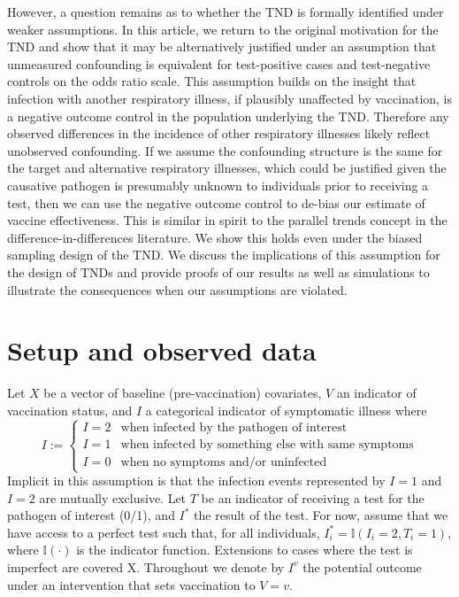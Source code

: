 \documentclass[11pt]{article}
\begin{document}
However, a question remains as to whether the TND is formally identified under weaker assumptions. In this article, we return to the original motivation for the TND and show that it may be alternatively justified under an assumption that unmeasured confounding is equivalent for test-positive cases and test-negative controls on the odds ratio scale. This assumption builds on the insight that infection with another respiratory illness, if plausibly unaffected by vaccination, is a negative outcome control in the population underlying the TND. Therefore any observed differences in the incidence of other respiratory illnesses likely reflect unobserved confounding. If we assume the confounding structure is the same for the target and alternative respiratory illnesses, which could be justified given the causative pathogen is presumably unknown to individuals prior to receiving a test, then we can use the negative outcome control to de-bias our estimate of vaccine effectiveness. This is similar in spirit to the parallel trends concept in the difference-in-differences literature. We show this holds even under the biased sampling design of the TND. We discuss the implications of this assumption for the design of TNDs and provide proofs of our results as well as simulations to illustrate the consequences when our assumptions are violated.

\section{Setup and observed data} \label{sec:setup}
Let $X$ be a vector of baseline (pre-vaccination) covariates, $V$ an indicator of vaccination status, and $I$ a categorical indicator of symptomatic illness where
        $$I := \begin{cases} 
        I = 2 & \text{when infected by the pathogen of interest} \\
        I = 1 & \text{when infected by something else with same symptoms} \\
        I = 0 & \text{when no symptoms and/or uninfected}
        \end{cases}$$
Implicit in this assumption is that the infection events represented by $I = 1$ and $I = 2$ are mutually exclusive. Let $T$ be an indicator of receiving a test for the pathogen of interest (0/1), and $I^*$ the result of the test. For now, assume that we have access to a perfect test such that, for all individuals, $I^*_i = \mathbb{I}(I_i = 2, T_i = 1)$, where $\mathbb{I}(\cdot)$ is the indicator function. Extensions to cases where the test is imperfect are covered X. Throughout we denote by $I^v$ the potential outcome under an intervention that sets vaccination to $V=v$. 
    
\end{document}

